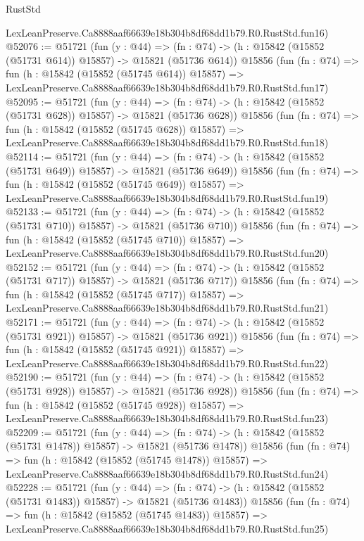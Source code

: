 \begin{lexlean}{RustStd}
\begin{coremodule}
    LexLeanPreserve.Ca8888aaf66639e18b304b8df68dd1b79.R0.RustStd.fun16)
@52076 := @51721
    (fun (y : @44) =>
    (fn : @74) -> (h : @15842 (@15852 (@51731 @614)) @15857) -> @15821 (@51736 @614))
    @15856
    (fun (fn : @74) =>
    fun (h : @15842 (@15852 (@51745 @614)) @15857) =>
    LexLeanPreserve.Ca8888aaf66639e18b304b8df68dd1b79.R0.RustStd.fun17)
@52095 := @51721
    (fun (y : @44) =>
    (fn : @74) -> (h : @15842 (@15852 (@51731 @628)) @15857) -> @15821 (@51736 @628))
    @15856
    (fun (fn : @74) =>
    fun (h : @15842 (@15852 (@51745 @628)) @15857) =>
    LexLeanPreserve.Ca8888aaf66639e18b304b8df68dd1b79.R0.RustStd.fun18)
@52114 := @51721
    (fun (y : @44) =>
    (fn : @74) -> (h : @15842 (@15852 (@51731 @649)) @15857) -> @15821 (@51736 @649))
    @15856
    (fun (fn : @74) =>
    fun (h : @15842 (@15852 (@51745 @649)) @15857) =>
    LexLeanPreserve.Ca8888aaf66639e18b304b8df68dd1b79.R0.RustStd.fun19)
@52133 := @51721
    (fun (y : @44) =>
    (fn : @74) -> (h : @15842 (@15852 (@51731 @710)) @15857) -> @15821 (@51736 @710))
    @15856
    (fun (fn : @74) =>
    fun (h : @15842 (@15852 (@51745 @710)) @15857) =>
    LexLeanPreserve.Ca8888aaf66639e18b304b8df68dd1b79.R0.RustStd.fun20)
@52152 := @51721
    (fun (y : @44) =>
    (fn : @74) -> (h : @15842 (@15852 (@51731 @717)) @15857) -> @15821 (@51736 @717))
    @15856
    (fun (fn : @74) =>
    fun (h : @15842 (@15852 (@51745 @717)) @15857) =>
    LexLeanPreserve.Ca8888aaf66639e18b304b8df68dd1b79.R0.RustStd.fun21)
@52171 := @51721
    (fun (y : @44) =>
    (fn : @74) -> (h : @15842 (@15852 (@51731 @921)) @15857) -> @15821 (@51736 @921))
    @15856
    (fun (fn : @74) =>
    fun (h : @15842 (@15852 (@51745 @921)) @15857) =>
    LexLeanPreserve.Ca8888aaf66639e18b304b8df68dd1b79.R0.RustStd.fun22)
@52190 := @51721
    (fun (y : @44) =>
    (fn : @74) -> (h : @15842 (@15852 (@51731 @928)) @15857) -> @15821 (@51736 @928))
    @15856
    (fun (fn : @74) =>
    fun (h : @15842 (@15852 (@51745 @928)) @15857) =>
    LexLeanPreserve.Ca8888aaf66639e18b304b8df68dd1b79.R0.RustStd.fun23)
@52209 := @51721
    (fun (y : @44) =>
    (fn : @74) -> (h : @15842 (@15852 (@51731 @1478)) @15857) -> @15821 (@51736 @1478))
    @15856
    (fun (fn : @74) =>
    fun (h : @15842 (@15852 (@51745 @1478)) @15857) =>
    LexLeanPreserve.Ca8888aaf66639e18b304b8df68dd1b79.R0.RustStd.fun24)
@52228 := @51721
    (fun (y : @44) =>
    (fn : @74) -> (h : @15842 (@15852 (@51731 @1483)) @15857) -> @15821 (@51736 @1483))
    @15856
    (fun (fn : @74) =>
    fun (h : @15842 (@15852 (@51745 @1483)) @15857) =>
    LexLeanPreserve.Ca8888aaf66639e18b304b8df68dd1b79.R0.RustStd.fun25)

\end{coremodule}
\end{lexlean}
